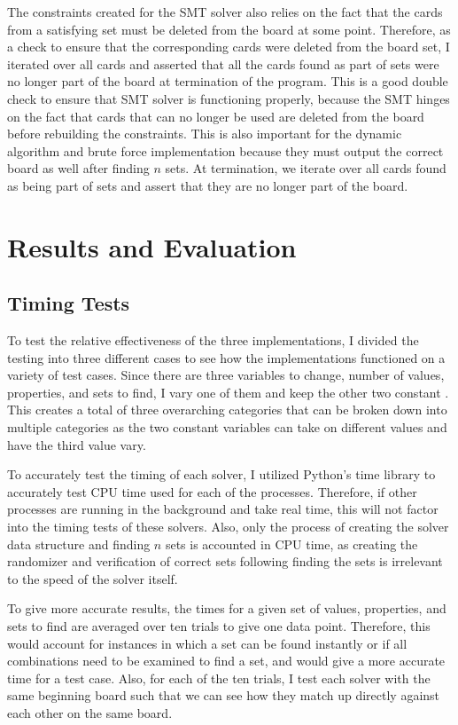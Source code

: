 \documentclass[pageno]{jpaper}
\begin{document}
The constraints created for the SMT solver also relies on the fact that the cards from a satisfying set must be deleted from the board at some point. Therefore, as a check to ensure that the corresponding cards were deleted from the board set, I iterated over all cards and asserted that all the cards found as part of sets were no longer part of the board at termination of the program. This is a good double check to ensure that SMT solver is functioning properly, because the SMT hinges on the fact that cards that can no longer be used are deleted from the board before rebuilding the constraints. This is also important for the dynamic algorithm and brute force implementation because they must output the correct board as well after finding $n$ sets. At termination, we iterate over all cards found as being part of sets and assert that they are no longer part of the board.

\section{Results and Evaluation}

\subsection{Timing Tests}

To test the relative effectiveness of the three implementations, I divided the testing into three different cases to see how the implementations functioned on a variety of test cases. Since there are three variables to change, number of values, properties, and sets to find, I vary one of them and keep the other two constant . This creates a total of three overarching categories that can be broken down into multiple categories as the two constant variables can take on different values and have the third value vary. 

To accurately test the timing of each solver, I utilized Python's time library to accurately test CPU time used for each of the processes. Therefore, if other processes are running in the background and take real time, this will not factor into the timing tests of these solvers. Also, only the process of creating the solver data structure and finding $n$ sets is accounted in CPU time, as creating the randomizer and verification of correct sets following finding the sets is irrelevant to the speed of the solver itself. 

To give more accurate results, the times for a given set of values, properties, and sets to find are averaged over ten trials to give one data point. Therefore, this would account for instances in which a set can be found instantly or if all combinations need to be examined to find a set, and would give a more accurate time for a test case. Also, for each of the ten trials, I test each solver with the same beginning board such that we can see how they match up directly against each other on the same board.
\end{document}
